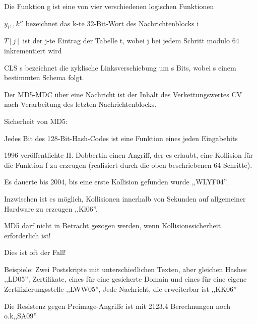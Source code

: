 \documentclass[a4paper]{article}
\begin{document}
\begin{multicols}{3}
\begin{itemize*}
            \begin{itemize*}
                  \item Die Funktion g ist eine von vier verschiedenen logischen Funktionen
                  \item $y_i,,k''$ bezeichnet das k-te 32-Bit-Wort des Nachrichtenblocks i
                  \item $T[j]$ ist der j-te Eintrag der Tabelle t, wobei j bei jedem Schritt modulo 64 inkrementiert wird
                  \item CLS s bezeichnet die zyklische Linksverschiebung um s Bits, wobei s einem bestimmten Schema folgt.
            \end{itemize*}
            \item Der MD5-MDC über eine Nachricht ist der Inhalt des Verkettungswertes
            CV nach Verarbeitung des letzten Nachrichtenblocks.
            \item Sicherheit von MD5:
            \begin{itemize*}
                  \item Jedes Bit des 128-Bit-Hash-Codes ist eine Funktion eines jeden Eingabebits
                  \item 1996 veröffentlichte H. Dobbertin einen Angriff, der es erlaubt, eine Kollision für die Funktion f zu erzeugen (realisiert durch die oben beschriebenen 64 Schritte).
                  \item Es dauerte bis 2004, bis eine erste Kollision gefunden wurde ,,WLYF04''.
                  \item Inzwischen ist es möglich, Kollisionen innerhalb von Sekunden auf allgemeiner Hardware zu erzeugen ,,Kl06''.
                  \item MD5 darf nicht in Betracht gezogen werden, wenn Kollisionssicherheit erforderlich ist!
                  \begin{itemize*} \item Dies ist oft der Fall! \item Beispiele: Zwei Postskripte mit unterschiedlichen Texten, aber gleichen Hashes ,,LD05'', Zertifikate, eines für eine gesicherte Domain und eines für eine eigene Zertifizierungsstelle ,,LWW05'', Jede Nachricht, die erweiterbar ist ,,KK06'' \end{itemize*}
                  \item Die Resistenz gegen Preimage-Angriffe ist mit 2123.4 Berechnungen noch o.k,,SA09''
            \end{itemize*}
      \end{itemize*}



\end{multicols}
\end{document}
